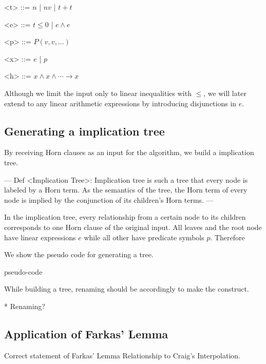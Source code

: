 \documentclass{llncs}
\begin{document}
\setlength{\grammarindent}{6em}
\begin{grammar}

<t> ::= $n$ | $nv$ | $t + t$

<e> ::= $t \leq 0$ | $e \wedge e$

<p> ::= $P (v, v, ... )$

<x> ::= $e$ | $p$  %

<h> ::= $x \wedge x \wedge \cdots \longrightarrow x$

\end{grammar}

Although we limit the input only to linear inequalities with $\leq$, we will later extend to any linear arithmetic expressions by introducing disjunctions in $e$.

\subsection{Generating a implication tree}

By receiving Horn clauses as an input for the algorithm, we build a
implication tree.

---
Def <Implication Tree>:
Implication tree is such a tree that every node is labeled by a Horn term. As the semantics of the tree, the Horn term of every node is implied by the conjunction of its children's Horn terms.
---

In the implication tree, every relationship from a certain node to its children corresponds to one Horn clause of the original input. All leaves and the root node have linear expressions $e$ while all other have predicate symbols $p$. Therefore

We show the pseudo code for generating a tree.

\begin{algorithm}
\caption{$\mbox{\sc BuildTree}$}
\begin{algorithmic}
\item pseudo-code
\end{algorithmic}
\end{algorithm}

While building a tree, renaming should be accordingly to make the construct.

* Renaming?

\subsection{Application of Farkas' Lemma}

Correct statement of Farkas' Lemma
Relationship to Craig's Interpolation.
\end{document}
